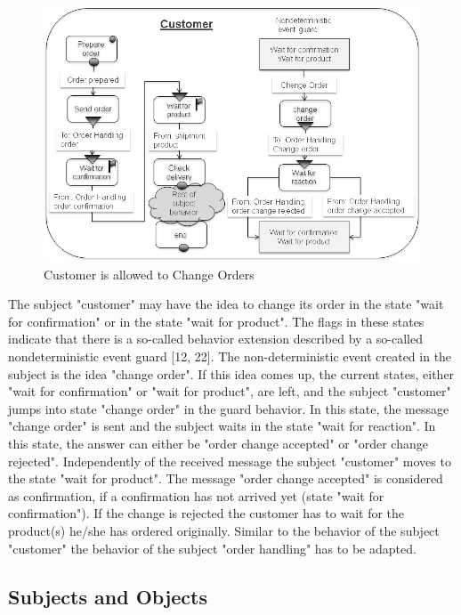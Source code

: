 \begin{figure}[htbp]
	\centering
	\includegraphics[width=0.9\linewidth]{Figures/Ontology/SubjectExecution/OrderCustomerChange}
	\caption[Customer is allowed to Change Orders]{Customer is allowed to Change Orders}
	\label{fig:ordercustomerchange}
\end{figure}

The subject "customer" may have the idea to change its order in the state "wait for confirmation" or in the state "wait for product". The flags in these states indicate that there is a so-called behavior extension described by a so-called nondeterministic event guard [12, 22]. The non-deterministic event created in the subject is the idea "change order". If this idea comes up, the current states, either "wait for confirmation" or "wait for product", are left, and the subject "customer" jumps into state "change order" in the guard behavior. In this state, the message "change order" is sent and the subject waits in the state "wait for reaction". In this state, the answer can either be "order change accepted" or "order change rejected". Independently of the received message the subject "customer" moves to the state "wait for product". The message "order change accepted" is considered as confirmation, if a confirmation has not arrived yet (state "wait for confirmation"). If the change is rejected the customer has to wait for the product(s) he/she has ordered originally. Similar to the behavior of the subject "customer" the behavior of the subject "order handling" has to be adapted.

\subsection{Subjects and Objects}
\label{SUbjects-Objects}

